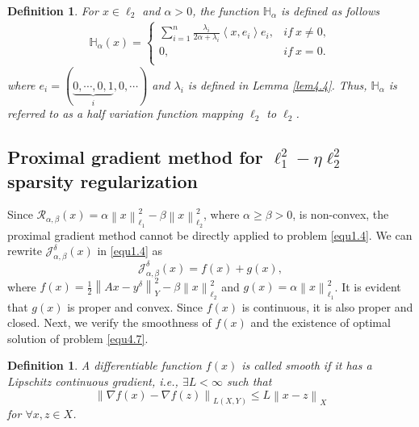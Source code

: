 \documentclass[a4paper,12pt]{article}
\newtheorem{definition}[theorem]{Definition}
\numberwithin{equation}{section}
\begin{document}
\begin{definition}\label{def4.5}
    For $x\in\ell_{2}$ and $\alpha>0$, the function $\mathbb{H}_{\alpha}$ is defined as follows
\begin{align}\label{equ4.6}
    \mathbb{H}_{\alpha}(x)=
    \left\{             
             \begin{array}{ll}
             \sum_{i=1}^{n}\frac{\lambda_{i}}{2\alpha+\lambda_{i}}\left<x, e_{i}\right>e_{i}, & if \ x\neq 0, \\
             0, & if \ x= 0. \\
             \end{array}
    \right.
\end{align}
where $e_{i}=(\underbrace{0,\cdots,0,1}_{i},0,\cdots)$ and $\lambda_{i}$ is defined in Lemma \ref{lem4.4}. Thus, $\mathbb{H}_{\alpha}$ is referred to as a half variation function mapping $\ell_{2}$ to $\ell_{2}$.
\end{definition}

\subsection{Proximal gradient method for $\ell_{1}^{2}-\eta\ell_{2}^{2}$ sparsity regularization}\label{sec4.3}

\par Since $\mathcal{R}_{\alpha,\beta}\left(x\right)=\alpha\left\|x\right\|_{\ell_{1}}^{2}- \beta\left\|x\right\|_{\ell_{2}}^{2}$, where $\alpha\geq\beta> 0$, is non-convex, the proximal gradient method cannot be directly applied to problem \eqref{equ1.4}. We can rewrite $\mathcal{J}_{\alpha,\beta}^{\delta}\left(x\right)$ in \eqref{equ1.4} as 
\begin{equation}\label{equ4.7}
    \mathcal{J}_{\alpha,\beta}^{\delta}\left(x\right)=f\left(x\right)+g\left(x\right),
\end{equation}
where $f\left(x\right)=\frac{1}{2}\left\|Ax-y^{\delta}\right\|_{Y}^{2} -\beta\left\|x\right\|_{\ell_{2}}^{2}$ and $g\left(x\right)=\alpha\left\|x\right\|_{\ell_{1}}^{2}$. It is evident that $g\left(x\right)$ is proper and convex. Since $f\left(x\right)$ is continuous, it is also proper and closed. Next, we verify the smoothness of $f\left(x\right)$ and the existence of optimal solution of problem \eqref{equ4.7}.

\begin{definition}\label{def4.6}
    A differentiable function $f\left(x\right)$ is called smooth if it has a Lipschitz continuous gradient, i.e., $\exists L<\infty$ such that
    \begin{equation*}
        \left\|\nabla f\left(x\right)-\nabla f\left(z\right)\right\|_{L\left(X,Y\right)}\leq L\left\|x-z\right\|_{X}
    \end{equation*}
    for $\forall x,z\in X$.
\end{definition}
\end{document}
